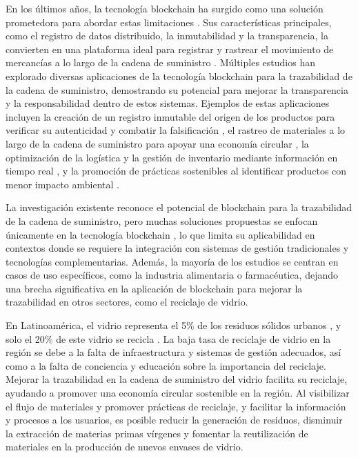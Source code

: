 En los últimos años, la tecnología blockchain ha surgido como una solución prometedora para abordar estas limitaciones \cite{baralla2023waste, bulkowska2023implementation, alnuaimi2023blockchain}. Sus características principales, como el registro de datos distribuido, la inmutabilidad y la transparencia, la convierten en una plataforma ideal para registrar y rastrear el movimiento de mercancías a lo largo de la cadena de suministro \cite{baralla2023waste}. Múltiples estudios han explorado diversas aplicaciones de la tecnología blockchain para la trazabilidad de la cadena de suministro, demostrando su potencial para mejorar la transparencia y la responsabilidad dentro de estos sistemas. Ejemplos de estas aplicaciones incluyen la creación de un registro inmutable del origen de los productos para verificar su autenticidad y combatir la falsificación \cite{bulkowska2023implementation}, el rastreo de materiales a lo largo de la cadena de suministro para apoyar una economía circular \cite{baralla2023waste}, la optimización de la logística y la gestión de inventario mediante información en tiempo real \cite{signeblock2024}, y la promoción de prácticas sostenibles al identificar productos con menor impacto ambiental \cite{bulkowska2023implementation}.

La investigación existente reconoce el potencial de blockchain para la trazabilidad de la cadena de suministro, pero muchas soluciones propuestas se enfocan únicamente en la tecnología blockchain \cite{baralla2023waste, bulkowska2023implementation, alnuaimi2023blockchain}, lo que limita su aplicabilidad en contextos donde se requiere la integración con sistemas de gestión tradicionales y tecnologías complementarias. Además, la mayoría de los estudios se centran en casos de uso específicos, como la industria alimentaria o farmacéutica, dejando una brecha significativa en la aplicación de blockchain para mejorar la trazabilidad en otros sectores, como el reciclaje de vidrio.

En Latinoamérica, el vidrio representa el 5\% de los residuos sólidos urbanos \cite{cepal2021economia}, y solo el 20\% de este vidrio se recicla \cite{verallia2022whitebook}. La baja tasa de reciclaje de vidrio en la región se debe a la falta de infraestructura y sistemas de gestión adecuados, así como a la falta de conciencia y educación sobre la importancia del reciclaje. Mejorar la trazabilidad en la cadena de suministro del vidrio facilita su reciclaje, ayudando a promover una economía circular sostenible en la región. Al visibilizar el flujo de materiales y promover prácticas de reciclaje, y facilitar la información y procesos a los usuarios, es posible reducir la generación de residuos, disminuir la extracción de materias primas vírgenes y fomentar la reutilización de materiales en la producción de nuevos envases de vidrio.

